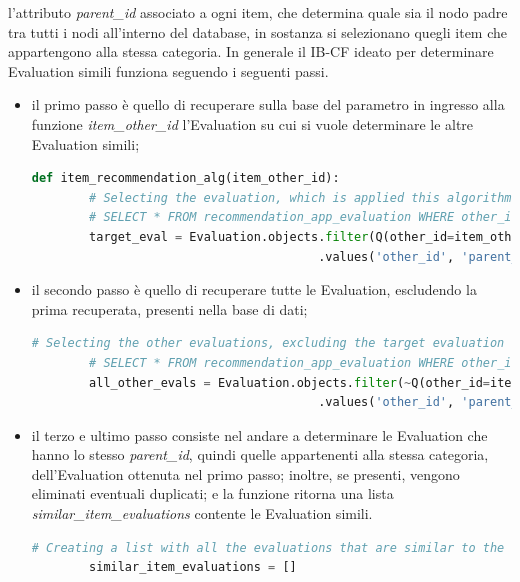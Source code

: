 l'attributo \textit{parent\_id} associato a ogni item, che determina quale sia il nodo padre tra tutti i nodi all'interno del database, in sostanza 
si selezionano quegli item che appartengono alla stessa categoria.\hfill\break
In generale il IB-CF ideato per determinare Evaluation simili funziona seguendo i seguenti passi.
\begin{itemize}
    \item il primo passo è quello di recuperare sulla base del parametro in ingresso alla funzione \textit{item\_other\_id} 
    l'Evaluation su cui si vuole determinare le altre Evaluation simili;
    \begin{lstlisting}[language=Python, label=lst:IB_CF_Evaluation_1]
    def item_recommendation_alg(item_other_id):
        # Selecting the evaluation, which is applied this algorithm, from its other_id
        # SELECT * FROM recommendation_app_evaluation WHERE other_id = %(item_other_id)s AND node_type = 'eva'
        target_eval = Evaluation.objects.filter(Q(other_id=item_other_id) & Q(node_type="eva"))\
                                        .values('other_id', 'parent_id')[0]
    \end{lstlisting} 
    \item il secondo passo è quello di recuperare tutte le Evaluation, escludendo la prima recuperata, presenti nella base di dati;
    \begin{lstlisting}[language=Python, label=lst:IB_CF_Evaluation_2]
        # Selecting the other evaluations, excluding the target evaluation
        # SELECT * FROM recommendation_app_evaluation WHERE other_id != %(item_other_id)s AND node_type = 'eva'
        all_other_evals = Evaluation.objects.filter(~Q(other_id=item_other_id) & Q(node_type="eva"))\
                                        .values('other_id', 'parent_id').order_by('other_id')
    \end{lstlisting}
    \item il terzo e ultimo passo consiste nel andare a determinare le Evaluation che hanno lo stesso \textit{parent\_id}, quindi 
    quelle appartenenti alla stessa categoria, dell'Evaluation ottenuta nel primo passo; inoltre, se presenti, vengono 
    eliminati eventuali duplicati; e la funzione ritorna una lista \textit{similar\_item\_evaluations} contente le Evaluation simili.
    \begin{lstlisting}[language=Python, label=lst:IB_CF_Evaluation_3]
        # Creating a list with all the evaluations that are similar to the target evaluation (comparing the parent_id)
        similar_item_evaluations = []

\end{lstlisting}
\end{itemize}
